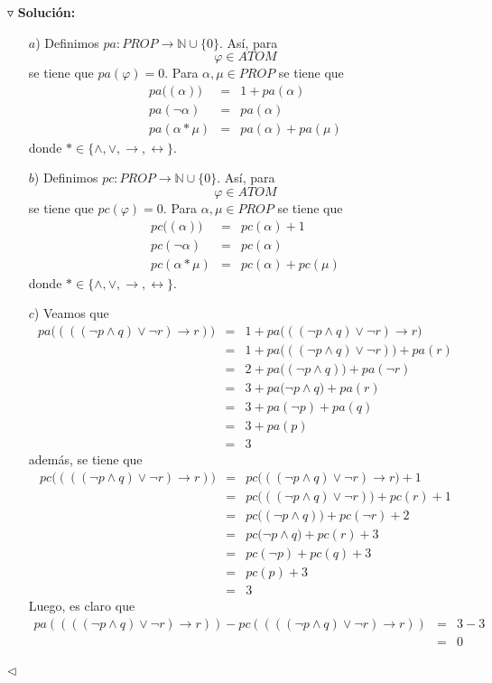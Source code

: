 \documentclass{article}
\begin{document}
$\triangledown$ \textbf{Solución:}
\begin{itemize}
  \item[$a$)] Definimos $pa: PROP \rightarrow \mathbb{N} \cup \{0\}$.
  Así, para
  \[
  \varphi \in ATOM
  \]
  se tiene que $pa(\varphi) = 0$. Para $\alpha, \mu \in PROP$ se tiene que
  \begin{eqnarray*}
    pa\big((\alpha)\big) &=& 1 + pa(\alpha)\\
    pa(\neg \alpha) &=& pa(\alpha)\\
    pa(\alpha * \mu) &=& pa(\alpha) + pa(\mu)
  \end{eqnarray*}
  donde $* \in \{\land, \lor, \rightarrow, \leftrightarrow\}$.
\item[$b$)] Definimos $pc: PROP \rightarrow \mathbb{N} \cup \{0\}$.
  Así, para
  \[
  \varphi \in ATOM
  \]
  se tiene que $pc(\varphi) = 0$. Para $\alpha, \mu \in PROP$ se tiene que
  \begin{eqnarray*}
    pc\big((\alpha)\big) &=& pc(\alpha) + 1\\
    pc(\neg \alpha) &=& pc(\alpha)\\
    pc(\alpha * \mu) &=& pc(\alpha) + pc(\mu)    
  \end{eqnarray*}
  donde $* \in \{\land, \lor, \rightarrow, \leftrightarrow\}$.
\item[$c$)] Veamos que
  \begin{eqnarray*}
    pa\big((((\neg p \land q) \lor \neg r) \rightarrow r)\big)  &=&
    1 + pa\big(((\neg p \land q) \lor \neg r) \rightarrow r\big)\\
    &=& 1 + pa\big(((\neg p \land q)\lor \neg r)\big) + pa(r)\\
    &=& 2 + pa\big((\neg p \land q)\big) + pa(\neg r)\\
    &=& 3 + pa\big(\neg p \land q\big) + pa(r)\\
    &=& 3 + pa(\neg p) + pa(q)\\
    &=& 3 + pa(p)\\
    &=& 3
  \end{eqnarray*}
  además, se tiene que
  \begin{eqnarray*}
     pc\big((((\neg p \land q) \lor \neg r) \rightarrow r)\big)  &=&
     pc\big(((\neg p \land q) \lor \neg r) \rightarrow r\big) + 1\\
     &=& pc\big(((\neg p \land q)\lor \neg r)\big) + pc(r) + 1\\
     &=& pc\big((\neg p \land q)\big) + pc(\neg r) + 2\\
     &=& pc\big(\neg p \land q\big) + pc(r) + 3\\
     &=& pc(\neg p) + pc(q) + 3\\
     &=& pc(p) + 3\\
     &=& 3
  \end{eqnarray*}
  Luego, es claro que
  \begin{eqnarray*}
    pa((((\neg p \land q) \lor \neg r) \rightarrow r)) - pc((((\neg p \land q) \lor \neg r) \rightarrow r))
    &=& 3 - 3\\
    &=& 0
  \end{eqnarray*}
\end{itemize}
\hfill $\lhd$
\end{document}
